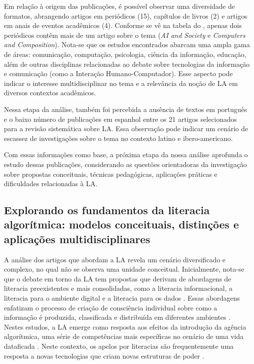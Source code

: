 Em relação à origem das publicações, é possível observar uma diversidade
de formatos, abrangendo artigos em periódicos (15), capítulos de livros
(2) e artigos em anais de eventos acadêmicos (4). Conforme se vê na
tabela do , apenas dois periódicos contêm mais de um artigo sobre
o tema (\emph{AI and Society} e \emph{Computers and Composition}).
Nota-se que os estudos encontrados abarcam uma ampla gama de áreas:
comunicação, computação, psicologia, ciência da informação, educação,
além de outras disciplinas relacionadas ao debate sobre tecnologias da
informação e comunicação (como a Interação Humano-Computador). Esse
aspecto pode indicar o interesse multidisciplinar no tema e a relevância
da noção de LA em diversos contextos acadêmicos.

Nessa etapa da análise, também foi percebida a ausência de textos em
português e o baixo número de publicações em espanhol entre os 21
artigos selecionados para a revisão sistemática sobre LA. Essa
observação pode indicar um cenário de escassez de investigações sobre o
tema no contexto latino e ibero-americano.

Com essas informações como base, a próxima etapa da nossa análise
aprofunda o estudo dessas publicações, considerando as questões
orientadoras da investigação sobre propostas conceituais, técnicas
pedagógicas, aplicações práticas e dificuldades relacionadas à LA.

\subsection{Explorando os fundamentos da literacia algorítmica: modelos
conceituais, distinções e aplicações multidisciplinares}\label{sub-sec-explorandoosfundamentos}

A análise dos artigos que abordam a LA revela um cenário diversificado e
complexo, no qual não se observa uma unidade conceitual. Inicialmente,
nota-se que o debate em torno da LA tem propostas que derivam de
abordagens de literacia preexistentes e mais consolidadas, como a
literacia informacional, a literacia para o ambiente digital e a
literacia para os dados \cite{Lloyd2019}. Essas abordagens enfatizam o
processo de criação de consciência individual sobre como a informação é
produzida, classificada e distribuída em diferentes ambientes \cite{Bakke2020}. Nestes estudos, a LA emerge como resposta aos efeitos da
introdução da agência algorítmica, uma série de competências mais
específicas no cenário de uma vida dataficada \cite{Kampa2021}.
Neste contexto, os apelos por literacias são frequentemente uma resposta
a novas tecnologias que criam novas estruturas de poder \cite{Devito2021}.

